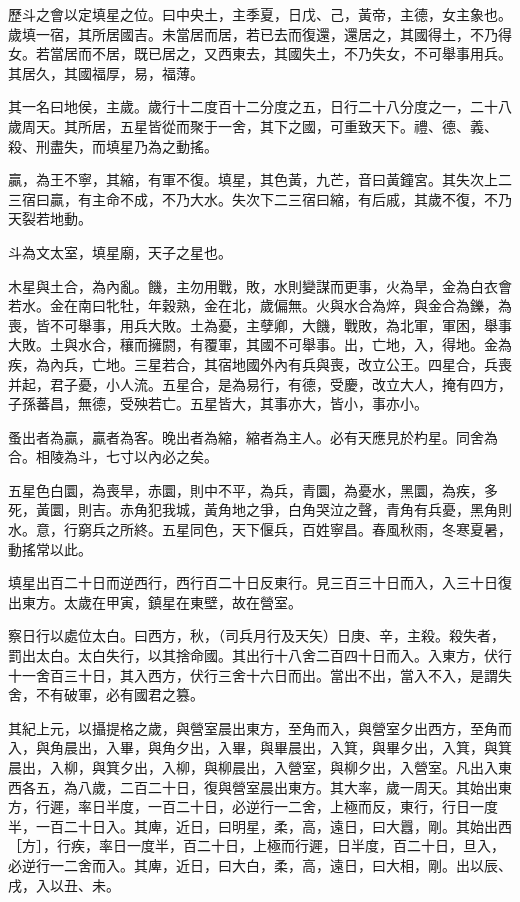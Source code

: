 歷斗之會以定填星之位。曰中央土，主季夏，日戊、己，黃帝，主德，女主象也。歲填一宿，其所居國吉。未當居而居，若已去而復還，還居之，其國得土，不乃得女。若當居而不居，既已居之，又西東去，其國失土，不乃失女，不可舉事用兵。其居久，其國福厚，易，福薄。

其一名曰地侯，主歲。歲行十二度百十二分度之五，日行二十八分度之一，二十八歲周天。其所居，五星皆從而聚于一舍，其下之國，可重致天下。禮、德、義、殺、刑盡失，而填星乃為之動搖。

贏，為王不寧，其縮，有軍不復。填星，其色黃，九芒，音曰黃鐘宮。其失次上二三宿曰贏，有主命不成，不乃大水。失次下二三宿曰縮，有后戚，其歲不復，不乃天裂若地動。

斗為文太室，填星廟，天子之星也。

木星與土合，為內亂。饑，主勿用戰，敗，水則變謀而更事，火為旱，金為白衣會若水。金在南曰牝牡，年穀熟，金在北，歲偏無。火與水合為焠，與金合為鑠，為喪，皆不可舉事，用兵大敗。土為憂，主孽卿，大饑，戰敗，為北軍，軍困，舉事大敗。土與水合，穰而擁閼，有覆軍，其國不可舉事。出，亡地，入，得地。金為疾，為內兵，亡地。三星若合，其宿地國外內有兵與喪，改立公王。四星合，兵喪并起，君子憂，小人流。五星合，是為易行，有德，受慶，改立大人，掩有四方，子孫蕃昌，無德，受殃若亡。五星皆大，其事亦大，皆小，事亦小。

蚤出者為贏，贏者為客。晚出者為縮，縮者為主人。必有天應見於杓星。同舍為合。相陵為斗，七寸以內必之矣。

五星色白圜，為喪旱，赤圜，則中不平，為兵，青圜，為憂水，黑圜，為疾，多死，黃圜，則吉。赤角犯我城，黃角地之爭，白角哭泣之聲，青角有兵憂，黑角則水。意，行窮兵之所終。五星同色，天下偃兵，百姓寧昌。春風秋雨，冬寒夏暑，動搖常以此。

填星出百二十日而逆西行，西行百二十日反東行。見三百三十日而入，入三十日復出東方。太歲在甲寅，鎮星在東壁，故在營室。

察日行以處位太白。曰西方，秋，（司兵月行及天矢）日庚、辛，主殺。殺失者，罰出太白。太白失行，以其捨命國。其出行十八舍二百四十日而入。入東方，伏行十一舍百三十日，其入西方，伏行三舍十六日而出。當出不出，當入不入，是謂失舍，不有破軍，必有國君之篡。

其紀上元，以攝提格之歲，與營室晨出東方，至角而入，與營室夕出西方，至角而入，與角晨出，入畢，與角夕出，入畢，與畢晨出，入箕，與畢夕出，入箕，與箕晨出，入柳，與箕夕出，入柳，與柳晨出，入營室，與柳夕出，入營室。凡出入東西各五，為八歲，二百二十日，復與營室晨出東方。其大率，歲一周天。其始出東方，行遲，率日半度，一百二十日，必逆行一二舍，上極而反，東行，行日一度半，一百二十日入。其庳，近日，曰明星，柔，高，遠日，曰大囂，剛。其始出西［方］，行疾，率日一度半，百二十日，上極而行遲，日半度，百二十日，旦入，必逆行一二舍而入。其庳，近日，曰大白，柔，高，遠日，曰大相，剛。出以辰、戌，入以丑、未。

